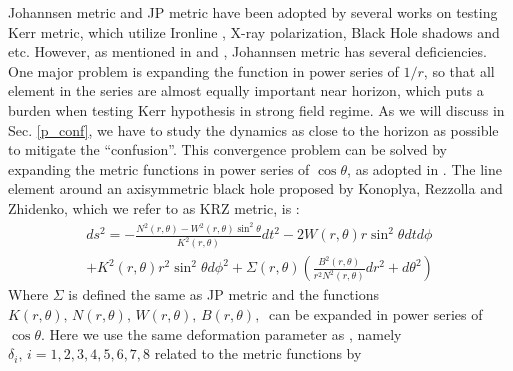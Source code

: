 \documentclass{article}
\begin{document}
Johannsen metric and JP metric have been adopted by several works on testing Kerr metric, which utilize Ironline\cite{t1_Iron} \cite{t4_Iron}, X-ray polarization\cite{t2_XrayPol}, Black Hole shadows\cite{t3_BHShadow} and etc. However, as mentioned in \cite{johannsen_diff} and \cite {KRZ}, Johannsen metric has several deficiencies. One major problem is expanding the function in power series of $1/r$, so that all element in the series are almost equally important near horizon, which puts a burden when testing Kerr hypothesis in strong field regime. As we will discuss in Sec. \ref{p_conf}, we have to study the dynamics as close to the horizon as possible to mitigate the ``confusion''. This convergence problem can be solved by expanding the metric functions in power series of $\cos \theta$, as adopted in \cite{KRZ}. The line element around an axisymmetric black hole proposed by Konoplya, Rezzolla and Zhidenko, which we refer to as KRZ metric, is \cite{KRZ}:
\begin{equation}
\begin{aligned}
	ds^2=-\frac{N^2(r,\theta)-W^2(r,\theta)\sin^2\theta}{K^2(r,\theta)} dt^2-2W(r,\theta)r\sin^2\theta dtd\phi \\+ K^2(r,\theta) r^2\sin^2\theta d\phi^2  +\Sigma(r,\theta)(\frac{B^2(r,\theta)}{r^2 N^2(r,\theta)} dr^2+d\theta^2)
\end{aligned}
\end{equation}
Where $\Sigma$ is defined the same as JP metric and the functions $K(r,\theta),\, N(r,\theta),\, W(r,\theta),\, B(r,\theta),\ $ can be expanded in power series of $\cos\theta$. Here we use the same deformation parameter as \cite{cosimoKRZ}, namely $\delta_i, \, i=1,2,3,4,5,6,7,8$ related to the metric functions by
\end{document}
